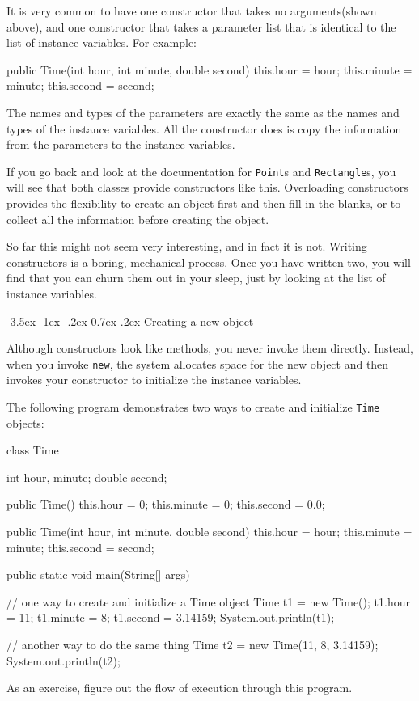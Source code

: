 \documentclass{book}
\makeatletter
\renewcommand{\section}{\@startsection 
    {section} {1} {0mm}%
    {-3.5ex \@plus -1ex \@minus -.2ex}%
    {0.7ex \@plus.2ex}%
    {\normalfont\Large\bfseries}}
\makeatother
\begin{document}
It is very common to have one constructor that takes no
arguments(shown above), and one constructor that takes
a parameter list that is identical to the list of instance
variables.  For example:

\begin{verbatimtab}
  public Time(int hour, int minute, double second) {
    this.hour = hour;
    this.minute = minute;
    this.second = second;
  }
\end{verbatimtab}
%
The names and types of the parameters are exactly the same as
the names and types of the instance variables.  All the
constructor does is copy the information from the parameters
to the instance variables.

If you go back and look at the documentation for {\tt Point}s
and {\tt Rectangle}s, you will see that both classes provide
constructors like this.  Overloading constructors provides the
flexibility to create an object first and then fill in the
blanks, or to collect all the information before creating
the object.

So far this might not seem very interesting, and in fact it
is not.  Writing constructors is a boring, mechanical process.
Once you have written two, you will find that you can churn them
out in your sleep, just by looking at the list of instance
variables.

\section{Creating a new object}

Although constructors look like methods, you never invoke them
directly.  Instead, when you invoke {\tt new}, the system
allocates space for the new object and then 
invokes your constructor to initialize the instance variables.

The following program demonstrates two ways to create and
initialize {\tt Time} objects:

\begin{verbatimtab}
class Time {
  int hour, minute;
  double second;

  public Time() {
    this.hour = 0;
    this.minute = 0;
    this.second = 0.0;
  }

  public Time(int hour, int minute, double second) {
    this.hour = hour;
    this.minute = minute;
    this.second = second;
  }

  public static void main(String[] args) {

    // one way to create and initialize a Time object
    Time t1 = new Time();
    t1.hour = 11;
    t1.minute = 8;
    t1.second = 3.14159;
    System.out.println(t1);

    // another way to do the same thing
    Time t2 = new Time(11, 8, 3.14159);
    System.out.println(t2);
  }
}
\end{verbatimtab}
%
As an exercise, figure out the flow of execution through this
program.
\end{document}
